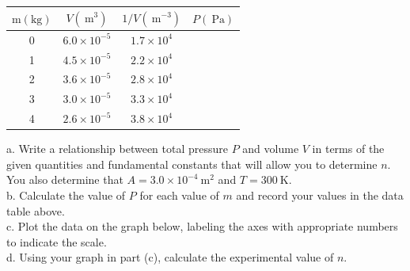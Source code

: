 \begin{enumerate}
\begin{center}
\begin{tabular}{|c|c|c|c|}
\hline
$\mathrm{m}(\mathrm{kg})$ & $V\left(\mathrm{~m}^{3}\right)$ & $1 / V\left(\mathrm{~m}^{-3}\right)$ & $P(\mathrm{~Pa})$ \\
\hline
0 & $6.0 \times 10^{-5}$ & $1.7 \times 10^{4}$ &  \\
\hline
1 & $4.5 \times 10^{-5}$ & $2.2 \times 10^{4}$ &  \\
\hline
2 & $3.6 \times 10^{-5}$ & $2.8 \times 10^{4}$ &  \\
\hline
3 & $3.0 \times 10^{-5}$ & $3.3 \times 10^{4}$ &  \\
\hline
4 & $2.6 \times 10^{-5}$ & $3.8 \times 10^{4}$ &  \\
\hline
\end{tabular}
\end{center}

a. Write a relationship between total pressure $P$ and volume $V$ in terms of the given quantities and fundamental constants that will allow you to determine $n$.\\
You also determine that $A=3.0 \times 10^{-4} \mathrm{~m}^{2}$ and $T=300 \mathrm{~K}$.\\
b. Calculate the value of $P$ for each value of $m$ and record your values in the data table above.\\
c. Plot the data on the graph below, labeling the axes with appropriate numbers to indicate the scale.\\
d. Using your graph in part (c), calculate the experimental value of $n$.


\end{enumerate}
